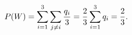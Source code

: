 \documentclass[preview]{standalone}
\begin{document}
\begin{align*}
\special{dvisvgm:raw <g id='unique000'>}P(W)=\sum_{i=1}^3\sum_{j\ne i}\frac{q_i}{3}=\frac23\sum_{i=1}^3q_i=\frac23.\special{dvisvgm:raw </g>}
\end{align*}
\end{document}
